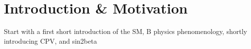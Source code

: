
\chapter{Introduction \& Motivation}


Start with a first short introduction of the SM, B physics phenomenology, shortly introducing CPV, and sin2beta
